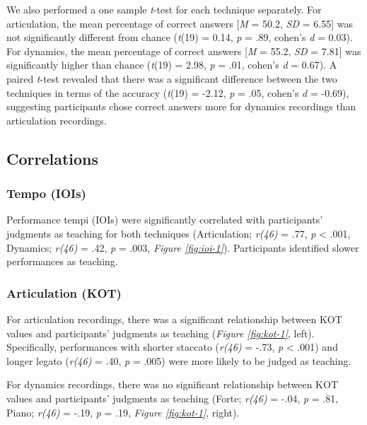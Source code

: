 \documentclass[
  man,floatsintext]{apa6}
\begin{document}
We also performed a one sample \emph{t}-test for each technique separately. For articulation, the mean percentage of correct answers {[}\emph{M} = 50.2, \emph{SD} = 6.55{]} was not significantly different from chance (\emph{t}(19) = 0.14, \emph{p} = .89, cohen's \emph{d} = 0.03). For dynamics, the mean percentage of correct answers {[}\emph{M} = 55.2, \emph{SD} = 7.81{]} was significantly higher than chance (\emph{t}(19) = 2.98, \emph{p} = .01, cohen's \emph{d} = 0.67). A paired \emph{t}-test revealed that there was a significant difference between the two techniques in terms of the accuracy (\emph{t}(19) = -2.12, \emph{p} = .05, cohen's \emph{d} = -0.69), suggesting participants chose correct answers more for dynamics recordings than articulation recordings.

\hypertarget{correlations}{%
\subsection{Correlations}\label{correlations}}

\hypertarget{tempo-iois}{%
\subsubsection{Tempo (IOIs)}\label{tempo-iois}}

Performance tempi (IOIs) were significantly correlated with participants' judgments as teaching for both techniques (Articulation; \emph{r(46)} = .77, \emph{p} \textless{} .001, Dynamics; \emph{r(46)} = .42, \emph{p} = .003, \emph{Figure \ref{fig:ioi-1}}). Participants identified slower performances as teaching.

\hypertarget{articulation-kot}{%
\subsubsection{Articulation (KOT)}\label{articulation-kot}}

For articulation recordings, there was a significant relationship between KOT values and participants' judgments as teaching (\emph{Figure \ref{fig:kot-1}}, left). Specifically, performances with shorter staccato (\emph{r(46)} = -.73, \emph{p} \textless{} .001) and longer legato (\emph{r(46)} = .40, \emph{p} = .005) were more likely to be judged as teaching.

For dynamics recordings, there was no significant relationship between KOT values and participants' judgments as teaching (Forte; \emph{r(46)} = -.04, \emph{p} = .81, Piano; \emph{r(46)} = -.19, \emph{p} = .19, \emph{Figure \ref{fig:kot-1}}, right).
\end{document}
